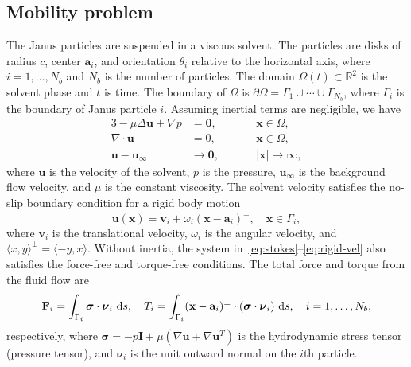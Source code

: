 \documentclass[prb,preprint,showpacs,preprintnumbers,amsmath,amssymb,longbibliography]{revtex4-1}
\renewcommand{\aa}{\mathbf{a}}
\newcommand{\bd}{\partial}
\newcommand{\FF}{\mathbf{F}}
\newcommand{\nnu}{\boldsymbol{\nu}}
\newcommand{\ssigma}{\boldsymbol{\sigma}}
\newcommand{\xx}{\mathbf{x}}
\newcommand{\uu}{\mathbf{u}}
\renewcommand{\vv}{\mathbf{v}}
\begin{document}
\subsection{Mobility problem}
The Janus particles are suspended in a viscous solvent.
The particles are disks of radius $c$, center $\aa_i$, and
orientation $\theta_i$ relative to the horizontal axis, where $i = 1, \dots, N_b$
and $N_b$ is the number of particles.
The domain $\Omega(t) \subset \mathbb{R}^2$ is the solvent phase and $t$
is time.  The boundary of
$\Omega$ is $\bd\Omega = \Gamma_1 \cup \cdots \cup \Gamma_{N_b}$, where
$\Gamma_i$ is the boundary of Janus particle $i$. Assuming inertial
terms are negligible, we have 
\begin{alignat}{3}
\label{eq:stokes}
  -\mu \Delta \uu + \nabla p &= \mathbf{0}, && \xx \in \Omega, \\
  \nabla\cdot \uu &= 0, \qquad && \xx \in \Omega, \\
  \uu - \uu_\infty &\to \mathbf{0}, && |\xx| \to \infty,
\end{alignat}
where $\uu$ is the velocity of the solvent, $p$ is the pressure,
$\uu_\infty$ is the background flow velocity, and $\mu$ is the constant
viscosity. The solvent velocity satisfies the no-slip boundary condition
for a rigid body motion
\begin{equation}
  \label{eq:rigid-vel}
  \uu(\xx) = \vv_i + \omega_i (\xx - \aa_i)^\perp, 
    \quad \xx \in \Gamma_i,
\end{equation}
where $\vv_i$ is the translational velocity, $\omega_i$ is the angular
velocity, and $\langle x, y \rangle^{\perp} = \langle -y, x\rangle$.
Without inertia, the system in~\eqref{eq:stokes}--\eqref{eq:rigid-vel}
also satisfies the force-free and torque-free conditions.
The total force
and torque from the fluid flow are
\begin{align}
  \label{eq:force}
 \FF_i = \int_{\Gamma_i} \ssigma \cdot \nnu_i \, \dif s, \quad
 T_i = \int_{\Gamma_i} (\xx - \aa_i)^\perp \cdot 
  (\ssigma \cdot \nnu_i) \, \dif s,
  \quad i=1,\ldots,N_b,
\end{align}
respectively, where $\ssigma = -p \mathbf{I} + \mu \left(\nabla \uu +
\nabla \uu^T \right)$ is the hydrodynamic stress tensor (pressure
tensor), and $\nnu_i$ is the unit outward normal on the $i$th particle.
\end{document}
